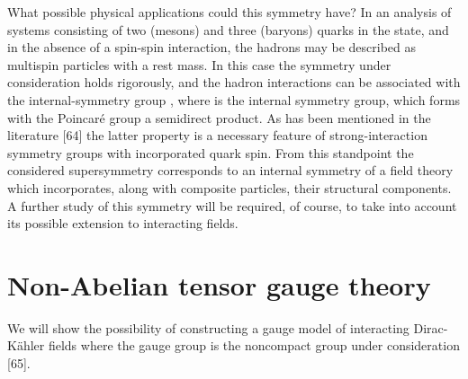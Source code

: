 \documentclass[a4paper,12pt]{article}
\begin{document}
What possible physical applications could this symmetry have? In
an analysis of systems consisting of two (mesons) and three
(baryons) quarks in the \coordHE{} state, and in the absence of a
spin-spin interaction, the hadrons may be described as multispin
particles with a rest mass. In this case the symmetry under
consideration holds rigorously, and the hadron interactions can be
associated with the internal-symmetry group \coordHE{}, where \coordHE{} is the internal symmetry group, which
forms with the Poincar\'e group a semidirect product. As has been
mentioned in the literature [64] the latter property is a
necessary feature of strong-interaction symmetry groups with
incorporated quark spin. From this standpoint the considered
supersymmetry corresponds to an internal symmetry of a field
theory which incorporates, along with composite particles, their
structural components. A further study of this symmetry will be
required, of course, to take into account its possible extension
to interacting fields.

\section{Non-Abelian tensor gauge theory}

We will show the possibility of constructing a gauge model of interacting
Dirac-K\"ahler fields where the gauge group is the noncompact group \coordHE{}
under consideration [65].
\end{document}
